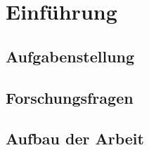 \section{Einführung}

\subsection{Aufgabenstellung}

\subsection{Forschungsfragen}

\subsection{Aufbau der Arbeit}
